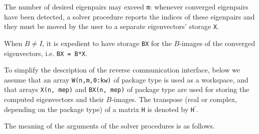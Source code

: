 The number of desired eigenpairs may exceed {\tt m}:
whenever converged eigenpairs have been detected,
a solver procedure reports the indices of these eigenpairs
and they must be moved by the user
to a separate eigenvectors' storage {\tt X}.

When $B \ne I$,
it is expedient to 
have %
storage {\tt BX}
for the $B$-images of the converged eigenvectors,
i.e. {\tt BX = B*X}.

To simplify the description of the %
reverse communication interface,
below we assume that an array
{\tt W(n,m,0:kw)} of package type
is used as a workspace,
and that arrays {\tt X(n, mep)} and {\tt BX(n, mep)} of package type
are used for storing the computed eigenvectors
and their $B$-images.
The transpose (real or complex, depending on the package type)
of a matrix {\tt H} 
is denoted by {\tt H}$^\prime$.

\medskip
The meaning of the arguments of the solver procedures is as follows.

